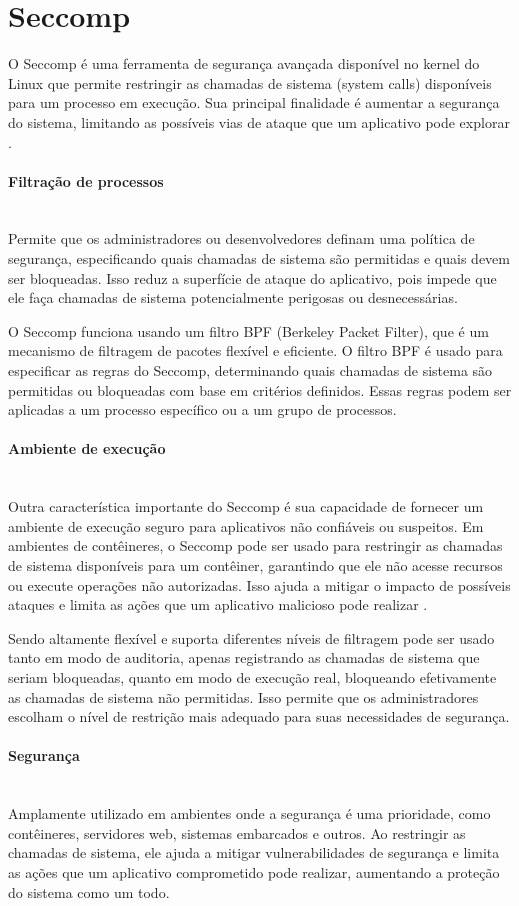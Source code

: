 \section{Seccomp}

O Seccomp é uma ferramenta de segurança avançada disponível no kernel do Linux que permite restringir as chamadas de sistema (system calls) disponíveis para um processo em execução. Sua principal finalidade é aumentar a segurança do sistema, limitando as possíveis vias de ataque que um aplicativo pode explorar \cite{seccomp-filter-kernel}.

\paragraph*{Filtração de processos}\mbox{}\\
 Permite que os administradores ou desenvolvedores definam uma política de segurança, especificando quais chamadas de sistema são permitidas e quais devem ser bloqueadas. Isso reduz a superfície de ataque do aplicativo, pois impede que ele faça chamadas de sistema potencialmente perigosas ou desnecessárias.

O Seccomp funciona usando um filtro BPF (Berkeley Packet Filter), que é um mecanismo de filtragem de pacotes flexível e eficiente. O filtro BPF é usado para especificar as regras do Seccomp, determinando quais chamadas de sistema são permitidas ou bloqueadas com base em critérios definidos. Essas regras podem ser aplicadas a um processo específico ou a um grupo de processos.

\paragraph*{Ambiente de execução}\mbox{}\\
Outra característica importante do Seccomp é sua capacidade de fornecer um ambiente de execução seguro para aplicativos não confiáveis ou suspeitos. Em ambientes de contêineres, o Seccomp pode ser usado para restringir as chamadas de sistema disponíveis para um contêiner, garantindo que ele não acesse recursos ou execute operações não autorizadas. Isso ajuda a mitigar o impacto de possíveis ataques e limita as ações que um aplicativo malicioso pode realizar \cite{seccomp-filter-kernel}.

Sendo altamente flexível e suporta diferentes níveis de filtragem pode ser usado tanto em modo de auditoria, apenas registrando as chamadas de sistema que seriam bloqueadas, quanto em modo de execução real, bloqueando efetivamente as chamadas de sistema não permitidas. Isso permite que os administradores escolham o nível de restrição mais adequado para suas necessidades de segurança.

\paragraph*{Segurança}\mbox{}\\
Amplamente utilizado em ambientes onde a segurança é uma prioridade, como contêineres, servidores web, sistemas embarcados e outros. Ao restringir as chamadas de sistema, ele ajuda a mitigar vulnerabilidades de segurança e limita as ações que um aplicativo comprometido pode realizar, aumentando a proteção do sistema como um todo.